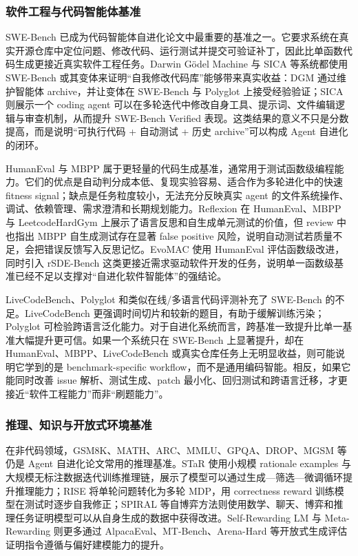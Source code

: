 \subsubsection{软件工程与代码智能体基准}

SWE-Bench 已成为代码智能体自进化论文中最重要的基准之一。它要求系统在真实开源仓库中定位问题、修改代码、运行测试并提交可验证补丁，因此比单函数代码生成更接近真实软件工程任务。Darwin Gödel Machine 与 SICA 等系统都使用 SWE-Bench 或其变体来证明“自我修改代码库”能够带来真实收益：DGM 通过维护智能体 archive，并让变体在 SWE-Bench 与 Polyglot 上接受经验验证；SICA 则展示一个 coding agent 可以在多轮迭代中修改自身工具、提示词、文件编辑逻辑与审查机制，从而提升 SWE-Bench Verified 表现。这类结果的意义不只是分数提高，而是说明“可执行代码 + 自动测试 + 历史 archive”可以构成 Agent 自进化的闭环。

HumanEval 与 MBPP 属于更轻量的代码生成基准，通常用于测试函数级编程能力。它们的优点是自动判分成本低、复现实验容易、适合作为多轮进化中的快速 fitness signal；缺点是任务粒度较小，无法充分反映真实 agent 的文件系统操作、调试、依赖管理、需求澄清和长期规划能力。Reflexion 在 HumanEval、MBPP 与 LeetcodeHardGym 上展示了语言反思和自生成单元测试的价值，但 review 中也指出 MBPP 自生成测试存在显著 false positive 风险，说明自动测试若质量不足，会把错误反馈写入反思记忆。EvoMAC 使用 HumanEval 评估函数级改进，同时引入 rSDE-Bench 这类更接近需求驱动软件开发的任务，说明单一函数级基准已经不足以支撑对“自进化软件智能体”的强结论。

LiveCodeBench、Polyglot 和类似在线/多语言代码评测补充了 SWE-Bench 的不足。LiveCodeBench 更强调时间切片和较新的题目，有助于缓解训练污染；Polyglot 可检验跨语言泛化能力。对于自进化系统而言，跨基准一致提升比单一基准大幅提升更可信。如果一个系统只在 SWE-Bench 上显著提升，却在 HumanEval、MBPP、LiveCodeBench 或真实仓库任务上无明显收益，则可能说明它学到的是 benchmark-specific workflow，而不是通用编码智能。相反，如果它能同时改善 issue 解析、测试生成、patch 最小化、回归测试和跨语言迁移，才更接近“软件工程能力”而非“刷题能力”。

\subsubsection{推理、知识与开放式环境基准}

在非代码领域，GSM8K、MATH、ARC、MMLU、GPQA、DROP、MGSM 等仍是 Agent 自进化论文常用的推理基准。STaR 使用小规模 rationale examples 与大规模无标注数据迭代训练推理链，展示了模型可以通过生成—筛选—微调循环提升推理能力；RISE 将单轮问题转化为多轮 MDP，用 correctness reward 训练模型在测试时逐步自我修正；SPIRAL 等自博弈方法则使用数学、聊天、博弈和推理任务证明模型可以从自身生成的数据中获得改进。Self-Rewarding LM 与 Meta-Rewarding 则更多通过 AlpacaEval、MT-Bench、Arena-Hard 等开放式生成评估证明指令遵循与偏好建模能力的提升。

